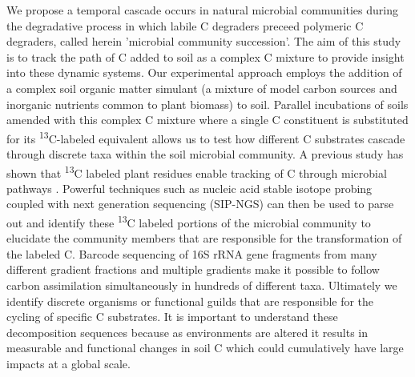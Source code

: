   

We propose a temporal cascade occurs in natural microbial communities during the degradative process in which labile C degraders preceed polymeric C degraders, called herein 'microbial community succession'. The aim of this study is to track the path of C added to soil as a complex C mixture to provide insight into these dynamic systems. Our experimental approach employs the addition of a complex soil organic matter simulant (a mixture of model carbon sources and inorganic nutrients common to plant biomass) to soil. Parallel incubations of soils amended with this complex C mixture where a single C constituent is substituted for its \textsuperscript{13}C-labeled equivalent allows us to test how different C substrates cascade through discrete taxa within the soil microbial community. A previous study has shown that \textsuperscript{13}C labeled plant residues enable tracking of C through microbial pathways \cite{Evershed_2006}. Powerful techniques such as nucleic acid stable isotope probing coupled with next generation sequencing (SIP-NGS) can then be used to parse out and identify these \textsuperscript{13}C labeled portions of the microbial community to elucidate the community members that are responsible for the transformation of the labeled C. Barcode sequencing of 16S rRNA gene fragments from many different gradient fractions and multiple gradients make it possible to follow carbon assimilation simultaneously in hundreds of different taxa. Ultimately we identify discrete organisms or functional guilds that are responsible for the cycling of specific C substrates. It is important to understand these decomposition sequences because as environments are altered it results in measurable and functional changes in soil C \cite{Grandy_2008} which could cumulatively have large impacts at a global scale. 

